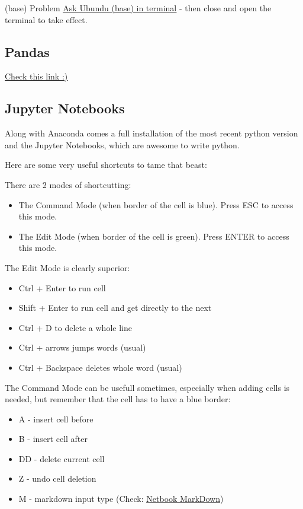 (base) Problem \href{https://askubuntu.com/questions/1026383/why-does-base-appear-in-front-of-my-terminal-prompt}{\ul{Ask Ubundu (base) in terminal}} - then close and open the terminal to take effect.



\subsection{Pandas}
\href{https://towardsdatascience.com/pandas-tips-and-tricks-33bcc8a40bb9?gi=29663f5b3e5
}{\ul{Check this link :)}}




\subsection{Jupyter Notebooks}
\par Along with Anaconda comes a full installation of the most recent python version and the Jupyter Notebooks, which are awesome to write python.
\par Here are some very useful shortcuts to tame that beast:
\vspace{.5cm}

\begin{center}
    There are 2 modes of shortcutting: 
\begin{itemize}
    \item The Command Mode (when border of the cell is blue). Press ESC to 
    access this mode.
    \item The Edit Mode (when border of the cell is green). Press ENTER to access this mode.
\end{itemize}

The Edit Mode is clearly superior: 
\begin{itemize}
    \item Ctrl + Enter to run cell
    \item Shift + Enter to run cell and get directly to the next
    \item Ctrl + D to delete a whole line
    \item Ctrl + arrows jumps words (usual)
    \item Ctrl + Backspace deletes whole word (usual)
\end{itemize} 

The Command Mode can be usefull sometimes, especially when adding cells is needed, but remember that the cell has to have a blue border:
\begin{itemize}
    \item A - insert cell before
    \item B - insert cell after
    \item DD - delete current cell
    \item Z - undo cell deletion
    \item M - markdown input type (Check: \href{https://gtribello.github.io/mathNET/assets/notebook-writing.html}{\ul{Netbook MarkDown}})
\end{itemize}


\end{center}




